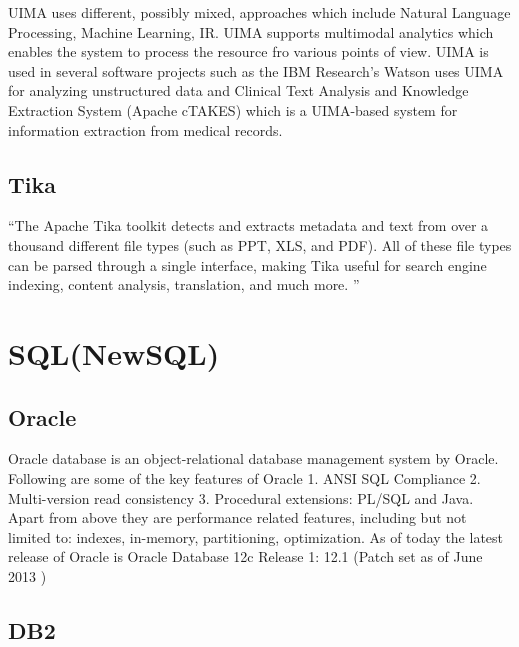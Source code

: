      UIMA uses different, possibly mixed, approaches which include
     Natural Language Processing, Machine Learning, IR. UIMA supports
     multimodal analytics \cite{www-uima-slideshare} which enables
     the system to process the resource fro various points of
     view. UIMA is used in several software projects such as the IBM
     Research's Watson uses UIMA for analyzing unstructured data and
     Clinical Text Analysis and Knowledge Extraction System (Apache
     cTAKES) which is a UIMA-based system for information extraction
     from medical records.
     
\subsection{ Tika}

     ``The Apache Tika toolkit detects and extracts metadata and text
     from over a thousand different file types (such as PPT, XLS, and
     PDF). All of these file types can be parsed through a single
     interface, making Tika useful for search engine indexing, content
     analysis, translation, and much more. \cite{www-tika}''


\section{SQL(NewSQL)}

\subsection{ Oracle}

     Oracle database is an object-relational database management system by 
     Oracle. Following are some of the key features of Oracle \cite{www-oracle}
     1. ANSI SQL Compliance
     2. Multi-version read consistency
     3. Procedural extensions: PL/SQL and Java.
     Apart from above they are performance related features, including but not 
     limited to: indexes, in-memory, partitioning, optimization. 
     As of today the latest release of Oracle is \cite{www-oracle}
     Oracle Database 12c Release 1: 12.1 (Patch set as of June 2013 )


\subsection{ DB2}

